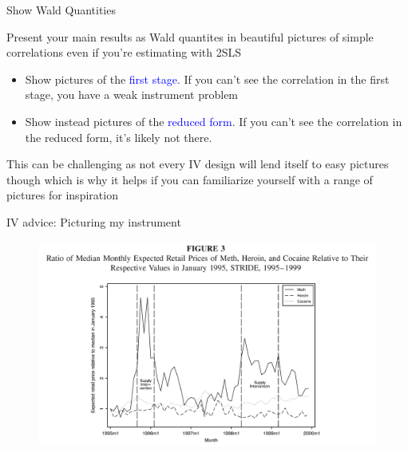 \documentclass{beamer}
\begin{document}
\begin{frame}{Show Wald Quantities}

Present your main results as Wald quantites in beautiful pictures of simple correlations even if you're estimating with 2SLS
	\begin{itemize}
	\item Show pictures of the \textcolor{blue}{first stage}. If you can't see the correlation in the first stage, you have a weak instrument problem
	\item Show instead pictures of the \textcolor{blue}{reduced form}.  If you can't see the correlation in the reduced form, it's likely not there.
	\end{itemize}
	
	\bigskip
	
This can be challenging as not every IV design will lend itself to easy pictures though which is why it helps if you can familiarize yourself with a range of pictures for inspiration	

\end{frame}



\begin{frame}{IV advice: Picturing my instrument}
	
	\begin{figure}
	\includegraphics[scale=0.15]{./lecture_includes/keith_1.png}
	\end{figure}
	
\end{frame}
\end{document}
